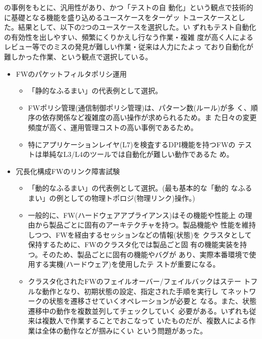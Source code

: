 の事例をもとに、汎用性があり、かつ「テストの自
動化」という観点で技術的に基礎となる機能を盛り込めるユースケースをターゲッ
トユースケースとした。結果として、以下の2つのユースケースを選択した。い
ずれもテスト自動化の有効性を出しやすい、頻繁にくりかえし行なう作業・複雑
度が高く人によるレビュー等でのミスの発見が難しい作業・従来は人力にたよっ
ており自動化が難しかった作業、という観点で選択している。
\begin{itemize}
 \item FWのパケットフィルタポリシ運用
       \begin{itemize}
        \item 「静的なふるまい」の代表例として選択。
        \item FWポリシ管理(通信制御ポリシ管理)は、パターン数(ルール)が多
              く、順序の依存関係など複雑度の高い操作が求められるため。ま
              た日々の変更頻度が高く、運用管理コストの高い事例であるため。
        \item 特にアプリケーションレイヤ(L7)を検査するDPI機能を持つFWの
              テストは単純なL3/L4のツールでは自動化が難しい動作であるた
              め。
       \end{itemize}
 \item 冗長化構成FWのリンク障害試験
       \begin{itemize}
        \item 「動的なふるまい」の代表例として選択。(最も基本的な「動的
              なふるまい」の例としての物理トポロジ(物理リンク)操作。)
        \item 一般的に、FW(ハードウェアアプライアンス)はその機能や性能上
              の理由から製品ごとに固有のアーキテクチャを持つ。製品機能や
              性能を維持しつつ、FWを経由するセッションなどの情報(状態)を
              クラスタとして保持するために、FWのクラスタ化では製品ごと固
              有の機能実装を持つ。そのため、製品ごとに固有の機能やバグが
              あり、実際本番環境で使用する実機(ハードウェア)を使用したテ
              ストが重要になる。
        \item クラスタ化されたFWのフェイルオーバー/フェイルバックはステー
              トフルな動作となり、初期状態の設定、指定された手順を実行し
              てネットワークの状態を遷移させていくオペレーションが必要と
              なる。また、状態遷移中の動作を複数並列してチェックしていく
              必要がある。いずれも従来は複数人で作業することでおこなって
              いたものだが、複数人による作業は全体の動作などが掴みにくい
              という問題があった。
       \end{itemize}
\end{itemize}

